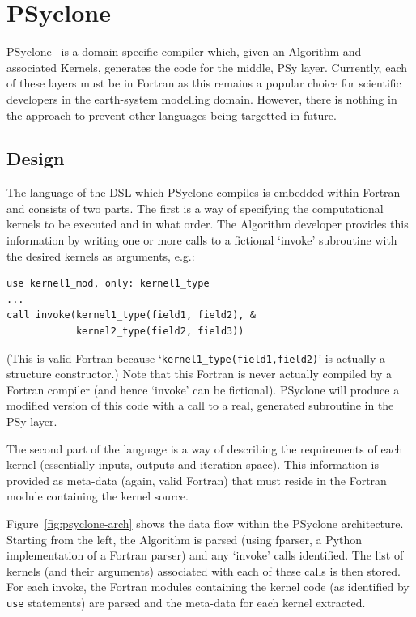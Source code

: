 \documentclass[times]{elsarticle}
\begin{document}
\section{\label{sec:psyclone}PSyclone}

PSyclone~\cite{psyclone} is a domain-specific compiler which, given an
Algorithm and associated Kernels, generates the code for the middle, PSy
layer. Currently, each of these layers must be in Fortran as this
remains a popular choice for scientific developers in the earth-system
modelling domain. However, there is nothing in the approach to prevent
other languages being targetted in future.

\subsection{Design}

The language of the DSL which PSyclone compiles is embedded within
Fortran and consists of two parts. The first is a way of specifying
the computational kernels to be executed and in what order.
The Algorithm developer provides this information by writing one or more
calls to a fictional `invoke' subroutine with the desired kernels as
arguments, e.g.:
\begin{lstlisting}
use kernel1_mod, only: kernel1_type
...
call invoke(kernel1_type(field1, field2), &
            kernel2_type(field2, field3))
\end{lstlisting}
(This is valid Fortran because `\lstinline!kernel1_type(field1,field2)!' is
actually a structure constructor.) Note that this Fortran
is never actually compiled by a Fortran compiler (and hence `invoke'
can be fictional). PSyclone will produce a modified version of this
code with a call to a real, generated subroutine in the PSy layer.

The second part of the language is a way of describing the
requirements of each kernel (essentially inputs, outputs and iteration
space). This information is provided as meta-data (again, valid Fortran)
that must reside in the Fortran module containing the kernel source.

Figure~\ref{fig:psyclone-arch} shows the data flow within the PSyclone
architecture.  Starting from the left, the Algorithm is parsed (using
fparser, a Python implementation of a Fortran parser) and any `invoke'
calls identified. The list of kernels (and their arguments) associated
with each of these calls is then stored. For each invoke, the Fortran
modules containing the kernel code (as identified by \lstinline!use!
statements) are parsed and the meta-data for each kernel extracted.
\end{document}

